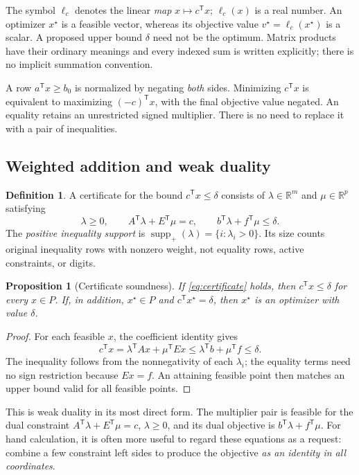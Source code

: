 \documentclass[11pt,letterpaper]{article}
\newcommand{\R}{\mathbb R}
\newcommand{\T}{\mathsf T}
\DeclareMathOperator{\supp}{supp}
\newtheorem{proposition}[theorem]{Proposition}
\theoremstyle{definition}
\newtheorem{definition}[theorem]{Definition}
\theoremstyle{remark}
\numberwithin{equation}{section}
\begin{document}
The symbol \(\ell_c\) denotes the linear \emph{map}
\(x\mapsto c^\T x\); \(\ell_c(x)\) is a real number.
An optimizer \(x^\star\) is a feasible vector, whereas its objective value
\(v^\star=\ell_c(x^\star)\) is a scalar. A proposed upper bound \(\delta\)
need not be the optimum. Matrix products have their ordinary meanings and
every indexed sum is written explicitly; there is no implicit summation
convention.

A row \(a^\T x\ge b_0\) is normalized by negating \emph{both} sides.
Minimizing \(c^\T x\) is equivalent to maximizing \((-c)^\T x\),
with the final objective value negated. An equality retains an unrestricted
signed multiplier. There is no need to replace it with a pair of inequalities.

\subsection{Weighted addition and weak duality}

\begin{definition}\label{def:bound}
A certificate for the bound \(c^\T x\le\delta\) consists of
\(\lambda\in\R^m\) and \(\mu\in\R^p\) satisfying
\begin{equation}\label{eq:certificate}
 \lambda\ge0,\qquad A^\T\lambda+E^\T\mu=c,\qquad
 b^\T\lambda+f^\T\mu\le\delta.
\end{equation}
The \emph{positive inequality support} is
\(\supp_+(\lambda)=\{i:\lambda_i>0\}\). Its size counts original inequality
rows with nonzero weight, not equality rows, active constraints, or digits.
\end{definition}

\begin{proposition}[Certificate soundness]\label{prop:sound}
If \eqref{eq:certificate} holds, then \(c^\T x\le\delta\) for every
\(x\in P\). If, in addition, \(x^\star\in P\) and
\(c^\T x^\star=\delta\), then \(x^\star\) is an optimizer with value \(\delta\).
\end{proposition}
\begin{proof}
For each feasible \(x\), the coefficient identity gives
\[
 c^\T x=\lambda^\T Ax+\mu^\T Ex
 \le\lambda^\T b+\mu^\T f\le\delta.
\]
The inequality follows from the nonnegativity of each \(\lambda_i\);
the equality terms need no sign restriction because \(Ex=f\).
An attaining feasible point then matches an upper bound valid for all
feasible points.
\end{proof}

This is weak duality in its most direct form. The multiplier pair is feasible
for the dual constraint \(A^\T\lambda+E^\T\mu=c\), \(\lambda\ge0\), and its
dual objective is \(b^\T\lambda+f^\T\mu\). For hand calculation, it is often
more useful to regard these equations as a request: combine a few constraint
left sides to produce the objective \emph{as an identity in all coordinates}.
\end{document}

